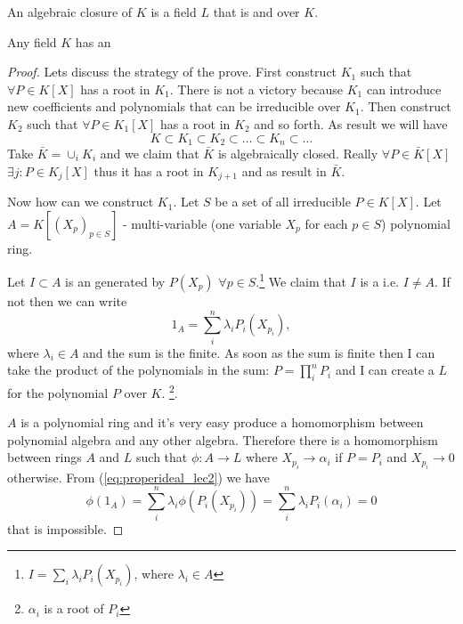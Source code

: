 \begin{definition}
  An algebraic closure of $K$ is a field $L$ that is
   and
  over $K$.
  \label{def:algebraicclosure}
\end{definition}

\begin{theorem}
  Any field $K$ has an 
  \begin{proof}
    Lets discuss the strategy of the prove.
    First construct $K_1$ such that $\forall P \in K\left[X\right]$
    has a root in $K_1$. There is not a victory because $K_1$ can
    introduce new coefficients and polynomials that can be irreducible
    over $K_1$. Then construct $K_2$ such that $\forall P \in
    K_1\left[X\right]$ has a root in $K_2$ and so forth. As result we
    will have
    \[
    K \subset K_1 \subset K_2 \subset \dots \subset K_n \subset \dots
    \]
    Take $\bar{K} = \cup_i K_i$ and we claim that $\bar{K}$ is
    algebraically closed. Really
    $\forall P \in \bar{K}\left[X\right]$ $\exists j: P \in
    K_j\left[X\right]$ thus it has a root in $K_{j+1}$ and as result
    in $\bar{K}$.

    Now how can we construct $K_1$. Let $S$ be a set of all
    irreducible $P \in K\left[X\right]$. Let
    $A = K\left[\left(X_p\right)_{p \in S}\right]$ - multi-variable
    (one variable $X_p$ for each $p \in S$) polynomial ring.

    Let $I \subset A$ is an  generated by $P\left(X_p\right)$
    $\forall p \in S$.\footnote
    {
      $I = \sum_i \lambda_i P_i\left(X_{p_i}\right)$, where $\lambda_i \in A$
    }
    We claim that $I$ is a  i.e. $I \ne
    A$. If not then we can write
    \begin{equation}
      1_A = \sum_i^n \lambda_i P_i\left(X_{p_i}\right),
      \label{eq:properideal_lec2}
    \end{equation}
    where $\lambda_i \in A$ and the sum is the finite. As soon as the
    sum is finite then I can take the product of the polynomials in
    the sum: $P = \prod_i^n P_i$ and I can create a
     $L$ for the polynomial $P$ over $K$.
    \footnote{$\alpha_i$ is a root of $P_i$}.

    $A$ is a polynomial ring and it's very easy produce a homomorphism
    between polynomial algebra and any other algebra. Therefore there
    is a homomorphism between rings $A$ and $L$ such that 
    $\phi: A \to L$ where $X_{p_i} \to \alpha_i$ if $P =P_i$ and
    $X_{p_i} \to 0$ otherwise. From (\ref{eq:properideal_lec2}) we
    have
    \[
    \phi(1_A) = \sum_i^n \lambda_i
    \phi\left(P_i\left(X_{p_i}\right)\right) =
    \sum_i^n \lambda_i P_i\left(\alpha_i\right) = 0
    \]
    that is impossible.


\end{proof}
\end{theorem}
